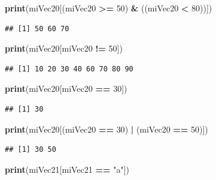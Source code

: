\documentclass[
]{book}
\newenvironment{Shaded}{\begin{snugshade}}{\end{snugshade}}
\newcommand{\DecValTok}[1]{\textcolor[rgb]{0.00,0.00,0.81}{#1}}
\newcommand{\KeywordTok}[1]{\textcolor[rgb]{0.13,0.29,0.53}{\textbf{#1}}}
\newcommand{\NormalTok}[1]{#1}
\newcommand{\OperatorTok}[1]{\textcolor[rgb]{0.81,0.36,0.00}{\textbf{#1}}}
\newcommand{\StringTok}[1]{\textcolor[rgb]{0.31,0.60,0.02}{#1}}
\begin{document}
\begin{Shaded}
\begin{Highlighting}[]
\KeywordTok{print}\NormalTok{(miVec20[(miVec20 }\OperatorTok{>=}\StringTok{ }\DecValTok{50}\NormalTok{) }\OperatorTok{&}\StringTok{ }\NormalTok{((miVec20 }\OperatorTok{<}\StringTok{ }\DecValTok{80}\NormalTok{))])}
\end{Highlighting}
\end{Shaded}

\begin{verbatim}
## [1] 50 60 70
\end{verbatim}

\begin{Shaded}
\begin{Highlighting}[]
\KeywordTok{print}\NormalTok{(miVec20[miVec20 }\OperatorTok{!=}\StringTok{ }\DecValTok{50}\NormalTok{])}
\end{Highlighting}
\end{Shaded}

\begin{verbatim}
## [1] 10 20 30 40 60 70 80 90
\end{verbatim}

\begin{Shaded}
\begin{Highlighting}[]
\KeywordTok{print}\NormalTok{(miVec20[miVec20 }\OperatorTok{==}\StringTok{ }\DecValTok{30}\NormalTok{])}
\end{Highlighting}
\end{Shaded}

\begin{verbatim}
## [1] 30
\end{verbatim}

\begin{Shaded}
\begin{Highlighting}[]
\KeywordTok{print}\NormalTok{(miVec20[(miVec20 }\OperatorTok{==}\StringTok{ }\DecValTok{30}\NormalTok{) }\OperatorTok{|}\StringTok{ }\NormalTok{(miVec20 }\OperatorTok{==}\StringTok{ }\DecValTok{50}\NormalTok{)])}
\end{Highlighting}
\end{Shaded}

\begin{verbatim}
## [1] 30 50
\end{verbatim}

\begin{Shaded}
\begin{Highlighting}[]
\KeywordTok{print}\NormalTok{(miVec21[miVec21 }\OperatorTok{==}\StringTok{ "a"}\NormalTok{])}
\end{Highlighting}
\end{Shaded}
\end{document}
